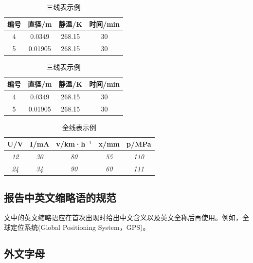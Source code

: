 \documentclass{gjm_report}
\begin{document}
\begin{multicols}{2}
  \begin{table}[H]
  \centering
    \captionnamefont{\wuhao\bf\heiti}
    \captiontitlefont{\wuhao\bf\heiti}
    \caption{三线表示例} \label{tab:eg1}
    \liuhao
  \begin{tabular}{cccc}
    \toprule
    {编号} &  {直径}/\si{\metre} & {静温}/\si{\kelvin} & {时间}/min\\
    \midrule 
    4 & 0.0349 & 268.15 & 30\\
    5 & 0.01905 & 268.15 & 30\\
    \bottomrule
  \end{tabular}
  \end{table}

  \begin{table}[H]
    \centering
    \captionnamefont{\wuhao\bf\heiti}
    \captiontitlefont{\wuhao\bf\heiti}
    \caption{三线表示例} \label{tab:eg1}
    \liuhao
    \begin{tabular}{cccc}
      \toprule
      {编号} &  {直径}/\si{\metre} & {静温}/\si{\kelvin} & {时间}/min\\
      \midrule 
      4 & 0.0349 & 268.15 & 30\\
      5 & 0.01905 & 268.15 & 30\\
      \bottomrule
    \end{tabular}
  \end{table}

  \begin{table}[H]
    \centering
    \captionnamefont{\wuhao\bf\heiti}
    \captiontitlefont{\wuhao\bf\heiti}
    \caption{全线表示例} \label{tab:eg2}
    \liuhao
    \begin{tabular}{|c|c|c|c|c|}
      \hline
      U/V & I/mA & v/km·h$^{-1}$ & x/mm & p/MPa \\ \hline
      \textit{12} & \textit{30} & \textit{80} & \textit{55} & \textit{110} \\ \hline
      \textit{24} & \textit{34} & \textit{90} & \textit{60} & \textit{111} \\ \hline
    \end{tabular}
  \end{table}
  
  \subsection{报告中英文缩略语的规范}
  文中的英文缩略语应在首次出现时给出中文含义以及英文全称后再使用。例如，全球定位系统(Global Positioning System，GPS)。


  \subsection{外文字母}

\end{multicols}
\end{document}
